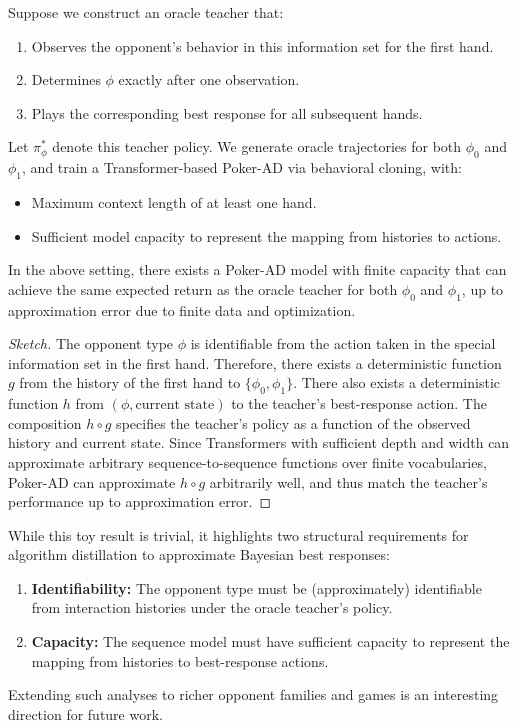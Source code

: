 \documentclass{article}
\begin{document}
Suppose we construct an oracle teacher that:
\begin{enumerate}[leftmargin=*]
    \item Observes the opponent's behavior in this information set for the first hand.
    \item Determines $\phi$ exactly after one observation.
    \item Plays the corresponding best response for all subsequent hands.
\end{enumerate}

Let $\pi^*_{\phi}$ denote this teacher policy. We generate oracle trajectories for both $\phi_0$ and $\phi_1$, and train a Transformer-based Poker-AD via behavioral cloning, with:
\begin{itemize}[leftmargin=*]
    \item Maximum context length of at least one hand.
    \item Sufficient model capacity to represent the mapping from histories to actions.
\end{itemize}

\begin{theorem}[Informal]
In the above setting, there exists a Poker-AD model with finite capacity that can achieve the same expected return as the oracle teacher for both $\phi_0$ and $\phi_1$, up to approximation error due to finite data and optimization.
\end{theorem}

\begin{proof}[Sketch]
The opponent type $\phi$ is identifiable from the action taken in the special information set in the first hand. Therefore, there exists a deterministic function $g$ from the history of the first hand to $\{\phi_0,\phi_1\}$. There also exists a deterministic function $h$ from $(\phi, \text{current state})$ to the teacher's best-response action. The composition $h \circ g$ specifies the teacher's policy as a function of the observed history and current state. Since Transformers with sufficient depth and width can approximate arbitrary sequence-to-sequence functions over finite vocabularies, Poker-AD can approximate $h \circ g$ arbitrarily well, and thus match the teacher's performance up to approximation error. \qedhere
\end{proof}

While this toy result is trivial, it highlights two structural requirements for algorithm distillation to approximate Bayesian best responses:
\begin{enumerate}[leftmargin=*]
    \item \textbf{Identifiability:} The opponent type must be (approximately) identifiable from interaction histories under the oracle teacher's policy.
    \item \textbf{Capacity:} The sequence model must have sufficient capacity to represent the mapping from histories to best-response actions.
\end{enumerate}
Extending such analyses to richer opponent families and games is an interesting direction for future work.
\end{document}
